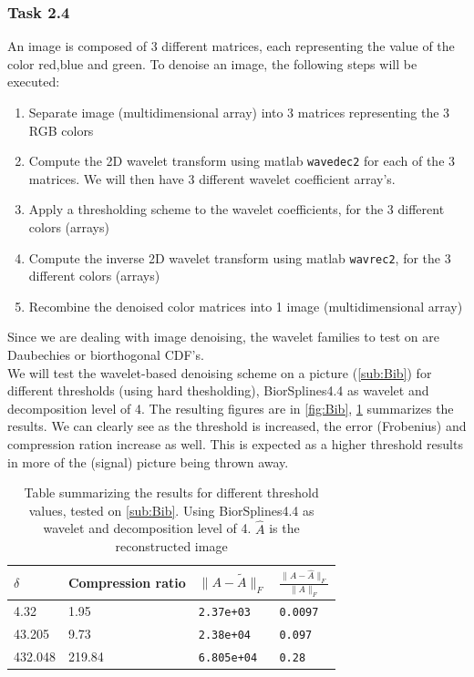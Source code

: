 \documentclass[a4paper]{article}
\begin{document}
    \subsubsection{Task 2.4} \label{subsubsec:Denoising}
	An image is composed of 3 different matrices, each representing the value of the color red,blue and green. To denoise an image, the following steps will be executed:
	\begin{enumerate}
		\item Separate image (multidimensional array) into 3 matrices representing the 3 RGB colors
		\item Compute the 2D wavelet transform using matlab \texttt{wavedec2} for each of the 3 matrices. We will then have 3 different wavelet coefficient array's.
		\item Apply a thresholding scheme to the wavelet coefficients, for the 3 different colors (arrays)
		\item Compute the inverse 2D wavelet transform using matlab \texttt{wavrec2}, for the 3 different colors (arrays)
		\item Recombine the denoised color matrices into 1 image (multidimensional array)
	\end{enumerate}
	Since we are dealing with image denoising, the wavelet families to test on are Daubechies or biorthogonal CDF's. \\

	We will test the wavelet-based denoising scheme on a picture (\cref{sub:Bib}) for different thresholds (using hard thesholding), BiorSplines4.4 as wavelet and decomposition level of 4. The resulting figures are in \cref{fig:Bib}, \cref{tab:bib} summarizes the results. We can clearly see as the threshold is increased, the error (Frobenius) and compression ration increase as well. This is expected as a higher threshold results in more of the (signal) picture being thrown away.

\begin{table}[H]
	\centering
	\begin{tabular}{|l|l|l|l|}
	\hline
	$\delta$	& Compression ratio & $\|A-\tilde{A}\|_F$ & $\frac{\|A-\hat{A}\|_F}{\|A\|_F}$ \\ \hline
	4.32	& 1.95 & \texttt{2.37e+03} & \texttt{0.0097} \\ \hline
	43.205	& 9.73 & \texttt{2.38e+04} & \texttt{0.097} \\ \hline
	432.048	& 219.84 & \texttt{6.805e+04} & \texttt{0.28} \\ \hline
	\end{tabular}
	\caption{Table summarizing the results for different threshold values, tested on \cref{sub:Bib}. Using BiorSplines4.4 as wavelet and decomposition level of 4. $\hat{A}$ is the reconstructed image}
	\label{tab:bib}
\end{table}
\end{document}
